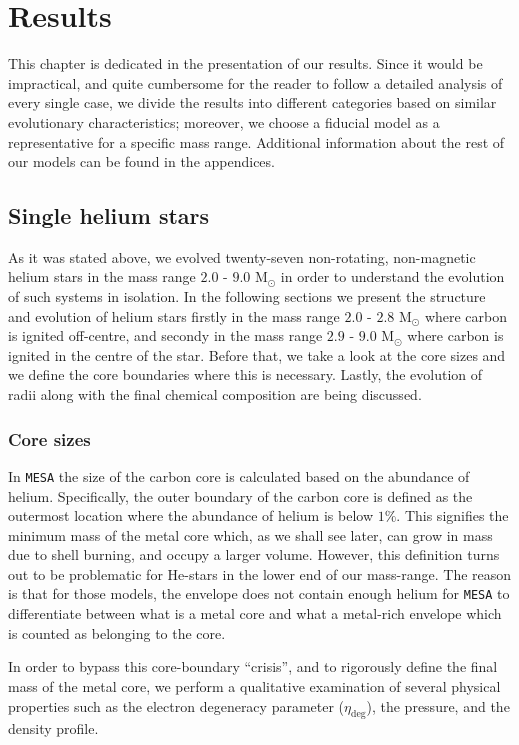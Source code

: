 \documentclass[../../main/thesis_msc.tex]{subfiles}
\begin{document}
	\chapter{Results}
		This chapter is dedicated in the presentation of our results. Since it would be impractical, and quite cumbersome for the reader to follow a detailed analysis of every single case, we divide the results into different categories based on similar evolutionary characteristics; moreover, we choose a fiducial model as a representative for a specific mass range. Additional information about the rest of our models can be found in the appendices.
	
		
		
			\section{Single helium stars}
				As it was stated above, we evolved twenty-seven non-rotating, non-magnetic helium stars in the mass range $2.0$ - $9.0$ M$_{\odot}$ in order to understand the evolution of such systems in isolation. In the following sections we present the structure and evolution of helium stars firstly in the mass range $2.0$ - $2.8$ M$_{\odot}$ where carbon is ignited off-centre, and secondy in the mass range $2.9$ - $9.0$ M$_{\odot}$ where carbon is ignited in the centre of the star. Before that, we take a look at the core sizes and we define the core boundaries where this is necessary. Lastly, the evolution of radii along with the final chemical composition are being discussed.
			
				\subsection{Core sizes}
					In \texttt{MESA} the size of the carbon core is calculated based on the abundance of helium. Specifically, the outer boundary of the carbon core is defined as the outermost location where the abundance of helium is below $1 \%$. This signifies the minimum mass of the metal core which, as we shall see later, can grow in mass due to shell burning, and occupy a larger volume. However, this definition turns out to be problematic for He-stars in the lower end of our mass-range. The reason is that for those models, the envelope does not contain enough helium for \texttt{MESA} to differentiate between what is a metal core and what a metal-rich envelope which is counted as belonging to the core.
					
					In order to bypass this core-boundary ``crisis'', and to rigorously define the final mass of the metal core, we perform a qualitative examination of several physical properties such as the electron degeneracy parameter ($\eta_{\text{deg}}$), the pressure, and the density profile.
			
\end{document}
